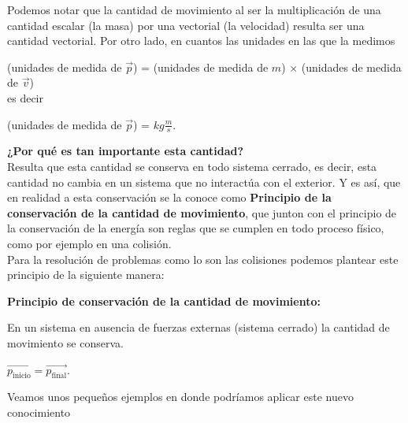 Podemos notar que la cantidad de movimiento al ser la multiplicación de una cantidad escalar (la masa) por una vectorial (la velocidad) resulta ser una cantidad vectorial. Por otro lado, en cuantos las unidades en las que la medimos\\ 

\vspace{0.2cm}
\begin{tcolorbox}
(unidades de medida de $\vec{p}$) = (unidades de medida de $m$) $\times$ (unidades de medida de $\vec{v}$)\\

es decir\\

\begin{center}
(unidades de medida de $\vec{p}$) = $kg\frac{m}{s}$.
\end{center}
\end{tcolorbox}
\vspace{0.2cm} 
 
\textbf{¿Por qué es tan importante esta cantidad?}\\

Resulta que esta cantidad se conserva en todo sistema cerrado, es decir, esta cantidad no cambia en un sistema que no interactúa  con el exterior. Y es así, que en realidad a esta conservación se la conoce como \textbf{Principio de la conservación de la cantidad de movimiento}, que junton con el principio de la conservación de la energía son reglas que se cumplen en todo proceso físico, como por ejemplo  en una colisión.\\

Para la resolución de problemas como lo son las colisiones podemos plantear este principio de la siguiente manera:

\vspace{0.2cm}
\begin{tcolorbox}
\textbf{Principio de conservación de la cantidad de movimiento:}

En un sistema en ausencia de fuerzas externas (sistema cerrado) la cantidad de movimiento se conserva.
 
\begin{center}
$\vec{p_{\text{inicio}}} = \vec{p_{\text{final}}}$. 
\end{center}

\end{tcolorbox}
\vspace{0.2cm}

Veamos unos pequeños ejemplos en donde podríamos aplicar este nuevo conocimiento

